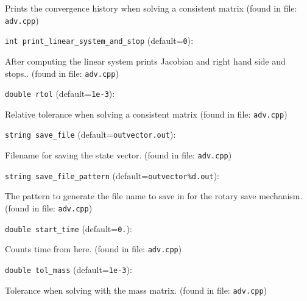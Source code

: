 Prints the convergence history when solving a consistent matrix
 (found in file: \verb+adv.cpp+)
\item\verb+int print_linear_system_and_stop+ {\rm(default=\verb|0|)}:

After computing the linear system prints Jacobian and
right hand side and stops.. 
 (found in file: \verb+adv.cpp+)
\item\verb+double rtol+ {\rm(default=\verb|1e-3|)}:

Relative tolerance when solving a consistent matrix
 (found in file: \verb+adv.cpp+)
\item\verb+string save_file+ {\rm(default=\verb|outvector.out|)}:

Filename for saving the state vector.
 (found in file: \verb+adv.cpp+)
\item\verb+string save_file_pattern+ {\rm(default=\verb|outvector%d.out|)}:

The pattern to generate the file name to save in for
the rotary save mechanism.
 (found in file: \verb+adv.cpp+)
\item\verb+double start_time+ {\rm(default=\verb|0.|)}:

Counts time from here.
 (found in file: \verb+adv.cpp+)
\item\verb+double tol_mass+ {\rm(default=\verb|1e-3|)}:

Tolerance when solving with the mass matrix. 
 (found in file: \verb+adv.cpp+)
